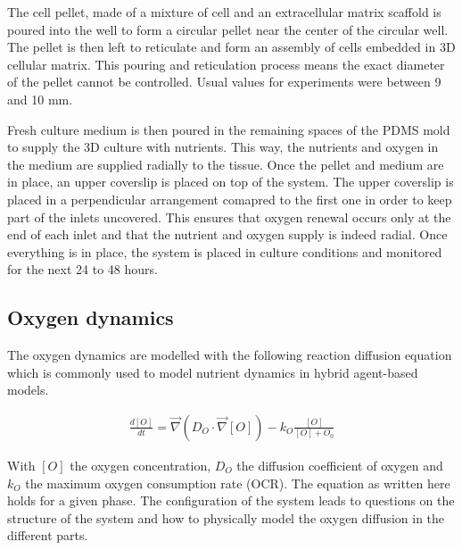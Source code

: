 \documentclass[11pt,a4paper]{article}
\begin{document}
The cell pellet, made of a mixture of cell and an extracellular matrix scaffold is poured into the well to form a circular pellet near the center of the circular well. The pellet is then left to reticulate and form an assembly of cells embedded in 3D cellular matrix. This pouring and reticulation process means the exact diameter of the pellet cannot be controlled. Usual values for experiments were between 9 and 10 mm.

Fresh culture medium is then poured in the remaining spaces of the PDMS mold to supply the 3D culture with nutrients. This way, the nutrients and oxygen in the medium are supplied radially to the tissue. Once the pellet and medium are in place, an upper coverslip is placed on top of the system. The upper coverslip is placed in a perpendicular arrangement comapred to the first one in order to keep part of the inlets uncovered. This ensures that oxygen renewal occurs only at the end of each inlet and that the nutrient and oxygen supply is indeed radial. Once everything is in place, the system is placed in culture conditions and monitored for the next 24 to 48 hours.

\subsection{Oxygen dynamics}
The oxygen dynamics are modelled with the following reaction diffusion equation which is commonly used to model nutrient dynamics in hybrid agent-based models.\cite{Mao2018}\cite{Kempf2005}\cite{Bull2020}

\begin{align}
\label{eqn:O} \frac{d [O]}{d t} = \overrightarrow{\nabla} (D_O \cdot \overrightarrow{\nabla} [O]) - k_O \frac{[O]}{[O] + O_0}  
\end{align}

With $[O]$ the oxygen concentration, $D_O$ the diffusion coefficient of oxygen and $k_O$ the maximum oxygen consumption rate (OCR). The equation as written here holds for a given phase.  The configuration of the system leads to questions on the structure of the system and how to physically model the oxygen diffusion in the different parts.
\end{document}
